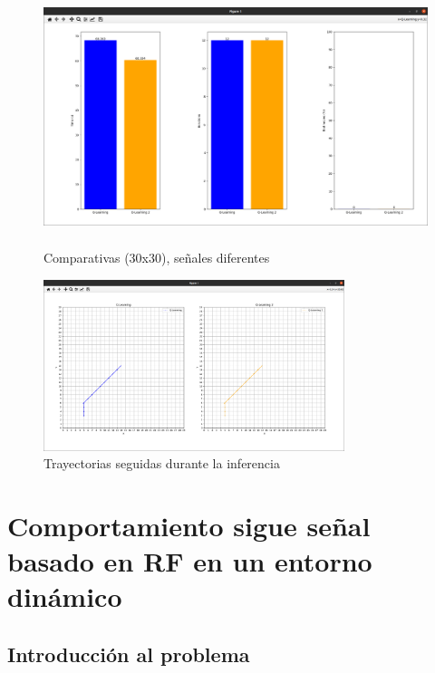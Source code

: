 \begin{figure} [H]
    \begin{center}
    \includegraphics[height=7.5cm]{imagenes/cap4/26_comp_diff.png}
    \end{center}
    \caption[Comparativas (30x30), señales diferentes]{Comparativas (30x30), señales diferentes}
    \label{fig:comp_diff_30}
\end{figure}

\begin{figure} [H]
    \begin{center}
    \includegraphics[height=5cm]{imagenes/cap4/13_trayectorias_12.png}
    \end{center}
    \caption[Trayectorias seguidas durante la inferencia]{Trayectorias seguidas durante la inferencia}
    \label{fig:12_traj}
\end{figure}

\section{Comportamiento sigue señal basado en \ac{RF} en un entorno dinámico}
\label{sec:signal_follow_obs}

\subsection{Introducción al problema}
\label{subsec:intro_sfo}

